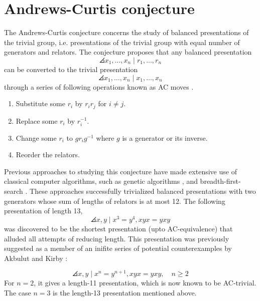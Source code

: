 
\section{Andrews-Curtis conjecture\label{sec:AC}}

The Andrews-Curtis conjecture concerns the study of balanced presentations of the trivial group, i.e. presentations of the trivial group with equal number of generators and relators. The conjecture proposes that any balanced presentation 
\[
\angles{x_1, \dots, x_n \mid r_1, \dots, r_n}
\]
can be converted to the trivial presentation
\[
\angles{x_1, \dots, x_n \mid x_1, \dots, x_n}
\]
through a series of following operations known as AC moves \cite{Andrews-Curtis}.

\begin{enumerate}
	\item Substitute some $r_i$ by $r_i r_j$ for $i \neq j$.
	\item Replace some $r_i$ by $r_i^{-1}$.
	\item Change some $r_i$ to $g r_i g^{-1}$ where $g$ is a generator or its inverse.
	\item Reorder the relators.
\end{enumerate}

Previous approaches to studying this conjecture have made extensive use of classical computer algorithms, such as genetic algorithms \cite{genetic}, and breadth-first-search  \cite{bfs-ac}. These approaches successfully trivialized balanced presentations with two generators whose sum of lengths of relators is at most 12. The following presentation of length 13,
\[
\angles{x, y \mid x^3 = y^4, xyx = yxy}
\]
was discovered to be the shortest presentation (upto AC-equivalence) that alluded all attempts of reducing length. This presentation was previously suggested as a member of an inifite series of potential counterexamples by Akbulut and Kirby \cite{Akbulut-Kirby}:

\[
\angles{x, y \mid x^n = y^{n+1}, xyx = yxy}, \quad n \geq 2
\]
For $n=2$, it gives a length-11 presentation, which is now known to be AC-trivial. The case $n=3$ is the length-13 presentation mentioned above. 
\newline

